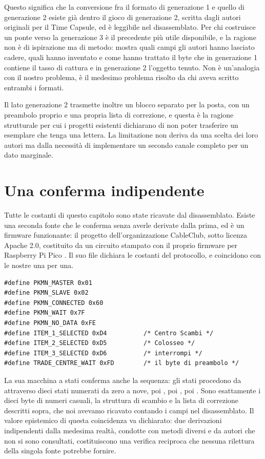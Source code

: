 Questo significa che la conversione fra il formato di generazione 1 e quello di generazione 2 esiste già dentro il gioco di generazione 2, scritta dagli autori originali per il Time Capsule, ed è leggibile nel disassemblato. Per chi costruisce un ponte verso la generazione 3 è il precedente più utile disponibile, e la ragione non è di ispirazione ma di metodo: mostra quali campi gli autori hanno lasciato cadere, quali hanno inventato e come hanno trattato il byte che in generazione 1 contiene il tasso di cattura e in generazione 2 l'oggetto tenuto. Non è un'analogia con il nostro problema, è il medesimo problema risolto da chi aveva scritto entrambi i formati.

Il lato generazione 2 trasmette inoltre un blocco separato per la posta, con un preambolo proprio e una propria lista di correzione, e questa è la ragione strutturale per cui i progetti esistenti dichiarano di non poter trasferire un esemplare che tenga una lettera. La limitazione non deriva da una scelta dei loro autori ma dalla necessità di implementare un secondo canale completo per un dato marginale.

\section{Una conferma indipendente}

Tutte le costanti di questo capitolo sono state ricavate dal disassemblato. Esiste una seconda fonte che le conferma senza averle derivate dalla prima, ed è un firmware funzionante: il progetto  dell'organizzazione CableClub, sotto licenza Apache 2.0, costituito da un circuito stampato con il proprio firmware per Raspberry Pi Pico \cite{cable-link}. Il suo file  dichiara le costanti del protocollo, e coincidono con le nostre una per una.

\begin{verbatim}
#define PKMN_MASTER 0x01
#define PKMN_SLAVE 0x02
#define PKMN_CONNECTED 0x60
#define PKMN_WAIT 0x7F
#define PKMN_NO_DATA 0xFE
#define ITEM_1_SELECTED 0xD4          /* Centro Scambi */
#define ITEM_2_SELECTED 0xD5          /* Colosseo */
#define ITEM_3_SELECTED 0xD6          /* interrompi */
#define TRADE_CENTRE_WAIT 0xFD        /* il byte di preambolo */
\end{verbatim}

La sua macchina a stati conferma anche la sequenza: gli stati procedono da  attraverso dieci stati  numerati da zero a nove, poi , poi , poi . Sono esattamente i dieci byte di numeri casuali, la struttura di scambio e la lista di correzione descritti sopra, che noi avevamo ricavato contando i campi nel disassemblato. Il valore epistemico di questa coincidenza va dichiarato: due derivazioni indipendenti dalla medesima realtà, condotte con metodi diversi e da autori che non si sono consultati, costituiscono una verifica reciproca che nessuna rilettura della singola fonte potrebbe fornire.

